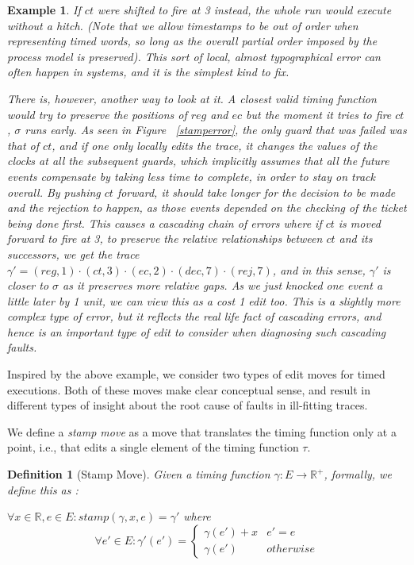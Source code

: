 \documentclass[conference]{IEEEtran}
\newcounter{cases}
\newtheorem{definition}{Definition}
\newtheorem{example}{Example}
\begin{document}
\begin{example}
		If $ct$ were shifted to fire at 3 instead, the whole run would execute without a hitch. (Note that we allow timestamps to be out of order when representing timed words, so long as the overall partial order imposed by the process model is preserved).
		This sort of local, almost typographical error can often happen in systems, and it is the simplest kind to fix.  
		
		There is, however, another way to look at it.
		A closest valid timing function would try to preserve the positions of $reg$ and  $ec$ but the moment it tries to fire $ct$, $\sigma$ runs early. 
		As seen in Figure ~\ref{stamperror}, the only guard that was failed was that of $ct$, and if one only locally edits the trace, it changes the values of the clocks at all the subsequent guards, which implicitly assumes that all the future events compensate by taking less time to complete, in order to stay on track overall.  
		By pushing $ct$ forward, it should take longer for the decision to be made and the rejection to happen, as those events depended on the checking of the ticket being done first. 
		This causes a cascading chain of errors where if $ct$ is moved forward to fire at 3, to preserve the relative relationships between $ct$ and its successors, we get the trace $\gamma' = (reg, 1)\cdot  (ct, 3)  \cdot (ec, 2) \cdot (dec, 7) \cdot (rej, 7)$, and in this sense, $\gamma'$ is closer to $\sigma$ as it preserves more relative gaps. 
		As we just knocked one event a little later by 1 unit, we can view this as a cost 1 edit too.  
		This is a slightly more complex type of error, but it reflects the real life fact of cascading errors, and hence is an important type of edit to consider when diagnosing such cascading faults. 

	\end{example}
	
	Inspired by the above example, we consider two types of edit moves for timed executions. 
	Both of these moves make clear conceptual sense, and result in different types of insight about the root cause of faults in ill-fitting traces. 
	
	We define a \textit{stamp move} as a move that translates the timing function only at a point, i.e., that edits a single element of the timing function $\tau$. 
	
	\begin{definition}[Stamp Move]
		Given a timing function $\gamma : E \to \mathbb{R}^+$, formally, we define this as : 
		
		$\forall x \in \mathbb{R}, e \in E : stamp(\gamma, x, e) =\gamma' $ where
		$$\forall e' \in E : \gamma'(e')  = \begin{cases}
			\gamma(e') + x & e' = e \\
			\gamma(e')& otherwise
		\end{cases}$$
		
	\end{definition}
	
\end{document}
